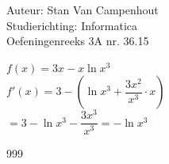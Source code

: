 \documentclass[a4paper]{article}
\begin{document}
  
\noindent \large Auteur: Stan Van Campenhout \\
\noindent \large Studierichting:  Informatica\\
\noindent \large Oefeningenreeks 3A nr. 36.15\\

\medskip

\normalsize

$ f(x) = 3x - x\ln x^3 $\\

$ f'(x) = 3 - \left(\ln x^3 + \dfrac{3x^2}{x^3} \cdot x \right) $\\

$ = 3 - \ln x^3 - \dfrac{3x^3}{x^3} = -\ln x^3 $\\

\begin{thebibliography}{999}
\end{thebibliography}
\end{document}
